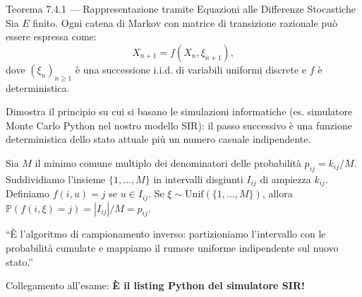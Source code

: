 \documentclass[11pt,a4paper]{report}
\begin{document}
\begin{teoremabox}{Teorema 7.4.1 --- Rappresentazione tramite Equazioni alle Differenze Stocastiche}
Sia $E$ finito. Ogni catena di Markov con matrice di transizione razionale può essere espressa come:
\[
X_{n+1} = f(X_n, \xi_{n+1}),
\]
dove $(\xi_n)_{n \ge 1}$ è una successione i.i.d. di variabili uniformi discrete e $f$ è deterministica.

\begin{cosafa}
Dimostra il principio su cui si basano le simulazioni informatiche (es. simulatore Monte Carlo Python nel nostro modello SIR): il passo successivo è una funzione deterministica dello stato attuale più un numero casuale indipendente.
\end{cosafa}

\begin{dimostrazione}
Sia $M$ il minimo comune multiplo dei denominatori delle probabilità $p_{ij} = k_{ij}/M$. Suddividiamo l'insieme $\{1, \dots, M\}$ in intervalli disgiunti $I_{ij}$ di ampiezza $k_{ij}$. Definiamo $f(i, u) = j$ se $u \in I_{ij}$. Se $\xi \sim \mathrm{Unif}(\{1, \dots, M\})$, allora $\mathbb{P}(f(i, \xi) = j) = |I_{ij}|/M = p_{ij}$.
\end{dimostrazione}

\begin{oralbox}
``È l'algoritmo di campionamento inverso: partizioniamo l'intervallo con le probabilità cumulate e mappiamo il rumore uniforme indipendente sul nuovo stato.''
\end{oralbox}

\begin{tipbox}
Collegamento all'esame: \textbf{È il listing Python del simulatore SIR!}
\end{tipbox}
\end{teoremabox}

\newpage
\end{document}
